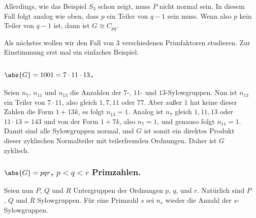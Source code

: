 \documentclass[12pt,a4paper,twoside]{article}
\begin{document}
Allerdings, wie das Beispiel $S_3$ schon zeigt, muss $P$ nicht normal sein. In
diesem Fall folgt analog wie oben, dass $p$ ein Teiler von $q-1$ sein
muss. Wenn also $p$ kein Teiler von $q-1$ ist, dann ist $G\cong C_{pq}$.

Als n\"achstes wollen wir den Fall von $3$ verschiedenen Primfaktoren
studieren. Zur Einstimmung erst mal ein einfaches Beispiel.

\subsubsection{$\abs{G}=1001=7\cdot 11\cdot 13$.}
Seien $n_7$, $n_{11}$ und $n_{13}$ die Anzahlen der $7$-, $11$- und
$13$-Sylowgruppen. Nun ist $n_{13}$ ein Teiler von $7\cdot11$, also gleich
$1,7,11$ oder $77$. Aber au\ss er $1$ hat keine dieser Zahlen die Form
$1+13k$, es folgt $n_{13}=1$. Analog ist $n_7$ gleich $1,11,13$ oder $11\cdot
13=143$ und von der Form $1+7k$, also $n_7=1$, und genauso folgt
$n_{11}=1$. Damit sind alle Sylowgruppen normal, und $G$ ist somit ein
direktes Produkt dieser zyklischen Normalteiler mit teilerfremden
Ordnungen. Daher ist $G$ zyklisch.

\subsubsection{$\abs{G}=pqr$, $p<q<r$ Primzahlen.}
Seien nun $P$, $Q$ und $R$ Untergruppen der Ordnungen $p$, $q$, und $r$.
Nat\"urlich sind $P$, $Q$ und $R$ Sylowgruppen. F\"ur eine Primzahl $s$ sei
$n_s$ wieder die Anzahl der $s$-Sylowgruppen.
\end{document}
